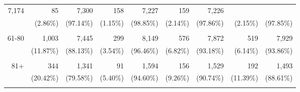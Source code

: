 \documentclass{article}
\begin{document}
\begin{table}[!h]
{\begin{tabular}{lllllllll}
			\multicolumn{1}{r}{7,174} &
			\multicolumn{1}{r}{85} &
			\multicolumn{1}{r}{7,300} &
			\multicolumn{1}{r}{158} &
			\multicolumn{1}{r}{7,227} &
			\multicolumn{1}{r}{159} &
			\multicolumn{1}{r}{7,226} \\
			\multicolumn{1}{r}{} &
			\multicolumn{1}{|r}{(2.86\%)} &
			\multicolumn{1}{r}{(97.14\%)} &
			\multicolumn{1}{r}{(1.15\%)} &
			\multicolumn{1}{r}{(98.85\%)} &
			\multicolumn{1}{r}{(2.14\%)} &
			\multicolumn{1}{r}{(97.86\%)} &
			\multicolumn{1}{r}{(2.15\%)} &
			\multicolumn{1}{r}{(97.85\%)} \\
			\multicolumn{1}{r}{} &
			\multicolumn{1}{|r}{} &
			\multicolumn{1}{r}{} &
			\multicolumn{1}{r}{} &
			\multicolumn{1}{r}{} &
			\multicolumn{1}{r}{} &
			\multicolumn{1}{r}{} &
			\multicolumn{1}{r}{} &
			\multicolumn{1}{r}{} \\
			\multicolumn{1}{r}{61-80\hspace{1em}} &
			\multicolumn{1}{|r}{1,003} &
			\multicolumn{1}{r}{7,445} &
			\multicolumn{1}{r}{299} &
			\multicolumn{1}{r}{8,149} &
			\multicolumn{1}{r}{576} &
			\multicolumn{1}{r}{7,872} &
			\multicolumn{1}{r}{519} &
			\multicolumn{1}{r}{7,929} \\
			\multicolumn{1}{r}{} &
			\multicolumn{1}{|r}{(11.87\%)} &
			\multicolumn{1}{r}{(88.13\%)} &
			\multicolumn{1}{r}{(3.54\%)} &
			\multicolumn{1}{r}{(96.46\%)} &
			\multicolumn{1}{r}{(6.82\%)} &
			\multicolumn{1}{r}{(93.18\%)} &
			\multicolumn{1}{r}{(6.14\%)} &
			\multicolumn{1}{r}{(93.86\%)} \\
			\multicolumn{1}{r}{} &
			\multicolumn{1}{|r}{} &
			\multicolumn{1}{r}{} &
			\multicolumn{1}{r}{} &
			\multicolumn{1}{r}{} &
			\multicolumn{1}{r}{} &
			\multicolumn{1}{r}{} &
			\multicolumn{1}{r}{} &
			\multicolumn{1}{r}{} \\
			\multicolumn{1}{r}{81+\hspace{1em}} &
			\multicolumn{1}{|r}{344} &
			\multicolumn{1}{r}{1,341} &
			\multicolumn{1}{r}{91} &
			\multicolumn{1}{r}{1,594} &
			\multicolumn{1}{r}{156} &
			\multicolumn{1}{r}{1,529} &
			\multicolumn{1}{r}{192} &
			\multicolumn{1}{r}{1,493} \\
			\multicolumn{1}{r}{} &
			\multicolumn{1}{|r}{(20.42\%)} &
			\multicolumn{1}{r}{(79.58\%)} &
			\multicolumn{1}{r}{(5.40\%)} &
			\multicolumn{1}{r}{(94.60\%)} &
			\multicolumn{1}{r}{(9.26\%)} &
			\multicolumn{1}{r}{(90.74\%)} &
			\multicolumn{1}{r}{(11.39\%)} &
			\multicolumn{1}{r}{(88.61\%)} \\
			\multicolumn{1}{r}{} &
			\multicolumn{1}{|r}{} &

\end{tabular}}
\end{table}
\end{document}

